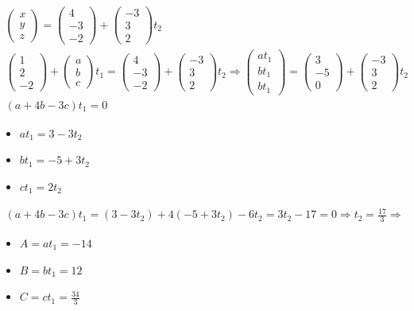 \documentclass[a4paper,11pt]{article}
\begin{document}
\begin{gather*}
\begin{pmatrix}
x \\
y \\
z 
\end{pmatrix}
= 
\begin{pmatrix}
4 \\
-3 \\
-2 
\end{pmatrix}
+ 
\begin{pmatrix}
-3 \\
3 \\
2 
\end{pmatrix}
t_2 \\
\begin{pmatrix}
1 \\
2 \\
-2 
\end{pmatrix}
+ 
\begin{pmatrix}
a \\
b \\
c 
\end{pmatrix}
t_1
= 
\begin{pmatrix}
4 \\
-3 \\
-2 
\end{pmatrix}
+ 
\begin{pmatrix}
-3 \\
3 \\
2 
\end{pmatrix}
t_2 \Rightarrow 
\begin{pmatrix}
at_1 \\
bt_1 \\
bt_1 
\end{pmatrix}
= \begin{pmatrix}
3 \\
-5 \\
0 
\end{pmatrix}
+ 
\begin{pmatrix}
-3 \\
3 \\
2 
\end{pmatrix}
t_2 \\
(a + 4b - 3c)t_1 = 0
\end{gather*}
\begin{itemize}
\item $ at_1 = 3 - 3t_2 $
\item $ bt_1 = -5 + 3t_2 $
\item $ ct_1 = 2t_2 $
\end{itemize}
\begin{gather*}
(a + 4b - 3c)t_1 = (3 - 3t_2) + 4(-5 + 3t_2) - 6t_2 = 3t_2 - 17 = 0 \Rightarrow t_2 = \frac{17}3 \Rightarrow
\end{gather*}
\begin{itemize}
\item $ A = at_1 = -14 $
\item $ B = bt_1 = 12 $
\item $ C = ct_1 = \frac{34}3 $
\end{itemize}
\end{document}

